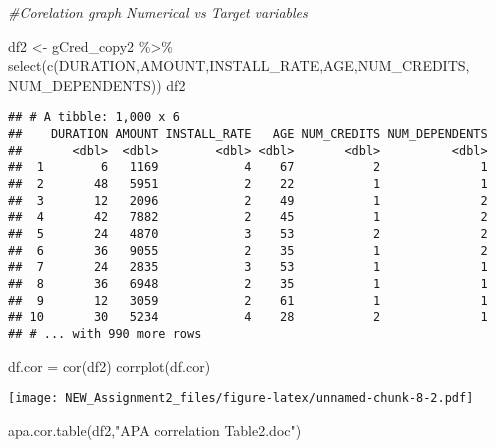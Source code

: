 \documentclass[
]{article}
\newenvironment{Shaded}{\begin{snugshade}}{\end{snugshade}}
\newcommand{\CommentTok}[1]{\textcolor[rgb]{0.56,0.35,0.01}{\textit{#1}}}
\newcommand{\FunctionTok}[1]{\textcolor[rgb]{0.00,0.00,0.00}{#1}}
\newcommand{\NormalTok}[1]{#1}
\newcommand{\OtherTok}[1]{\textcolor[rgb]{0.56,0.35,0.01}{#1}}
\newcommand{\SpecialCharTok}[1]{\textcolor[rgb]{0.00,0.00,0.00}{#1}}
\newcommand{\StringTok}[1]{\textcolor[rgb]{0.31,0.60,0.02}{#1}}
\begin{document}
\begin{Shaded}
\begin{Highlighting}[]
\CommentTok{\#Corelation graph Numerical vs Target variables}

\NormalTok{df2 }\OtherTok{\textless{}{-}}\NormalTok{ gCred\_copy2 }\SpecialCharTok{\%\textgreater{}\%} \FunctionTok{select}\NormalTok{(}\FunctionTok{c}\NormalTok{(DURATION,AMOUNT,INSTALL\_RATE,AGE,NUM\_CREDITS,}
\NormalTok{                                NUM\_DEPENDENTS))}
\NormalTok{df2}
\end{Highlighting}
\end{Shaded}

\begin{verbatim}
## # A tibble: 1,000 x 6
##    DURATION AMOUNT INSTALL_RATE   AGE NUM_CREDITS NUM_DEPENDENTS
##       <dbl>  <dbl>        <dbl> <dbl>       <dbl>          <dbl>
##  1        6   1169            4    67           2              1
##  2       48   5951            2    22           1              1
##  3       12   2096            2    49           1              2
##  4       42   7882            2    45           1              2
##  5       24   4870            3    53           2              2
##  6       36   9055            2    35           1              2
##  7       24   2835            3    53           1              1
##  8       36   6948            2    35           1              1
##  9       12   3059            2    61           1              1
## 10       30   5234            4    28           2              1
## # ... with 990 more rows
\end{verbatim}

\begin{Shaded}
\begin{Highlighting}[]
\NormalTok{df.cor }\OtherTok{=} \FunctionTok{cor}\NormalTok{(df2)}
\FunctionTok{corrplot}\NormalTok{(df.cor)}
\end{Highlighting}
\end{Shaded}

\texttt{[image: NEW\_Assignment2\_files/figure-latex/unnamed-chunk-8-2.pdf]}

\begin{Shaded}
\begin{Highlighting}[]
\FunctionTok{apa.cor.table}\NormalTok{(df2,}\StringTok{"APA correlation Table2.doc"}\NormalTok{)}
\end{Highlighting}
\end{Shaded}
\end{document}
